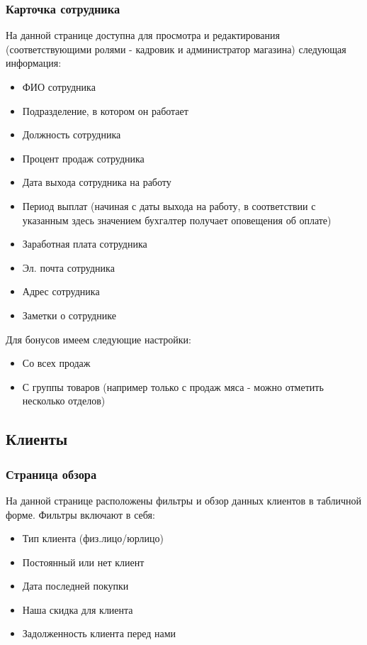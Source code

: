 \documentclass[DIV=calc, paper=a4, fontsize=11pt]{scrartcl} %
\begin{document}
\subsubsection{Карточка сотрудника}

На данной странице доступна для просмотра и редактирования (соответствующими ролями - кадровик и администратор магазина) следующая информация:

\begin{itemize}
	\item ФИО сотрудника
	\item Подразделение, в котором он работает 
	\item Должность сотрудника
	\item Процент продаж сотрудника
	\item Дата выхода сотрудника на работу
	\item Период выплат (начиная с даты выхода на работу, в соответствии с указанным здесь значением бухгалтер получает оповещения об оплате)
	\item Заработная плата сотрудника
	\item Эл. почта сотрудника
	\item Адрес сотрудника
	\item Заметки о сотруднике
\end{itemize}

Для бонусов имеем следующие настройки:

\begin{itemize}
	\item Со всех продаж
	\item С группы товаров (например только с продаж мяса - можно отметить несколько отделов)
\end{itemize}

\subsection{Клиенты}

\subsubsection{Страница обзора}

На данной странице расположены фильтры и обзор данных клиентов в табличной форме. Фильтры включают в себя:

\begin{itemize}
	\item Тип клиента (физ.лицо/юрлицо)
	\item Постоянный или нет клиент
	\item Дата последней покупки
	\item Наша скидка для клиента
	\item Задолженность клиента перед нами
\end{itemize}
\end{document}
